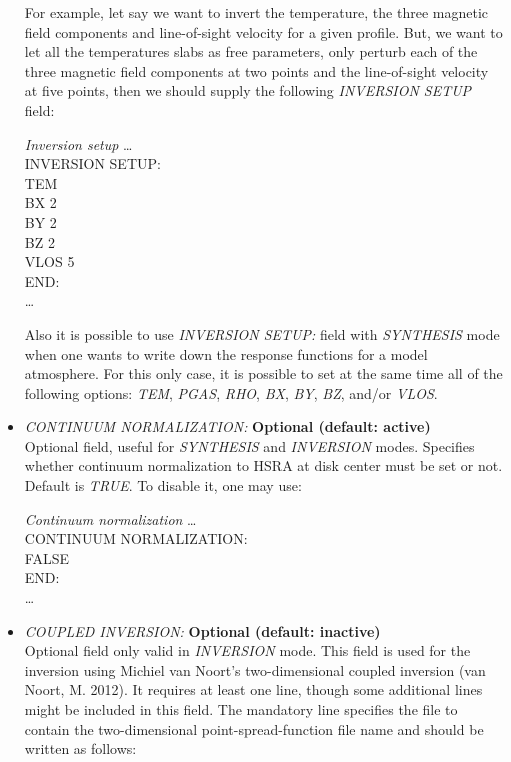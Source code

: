 \begin{itemize}
  For example, let say we want to invert the temperature, the three magnetic field components and line-of-sight velocity for a given profile. But, we want to let all the temperatures slabs as free parameters, only perturb each of the three magnetic field components at two points and the line-of-sight velocity at five points, then we should supply the following {\it INVERSION SETUP} field: \\
\begin{ifbox}[label={tb:inversion_setup}]{{\it Inversion setup}}
  \scriptsize
  \ldots\\
  INVERSION SETUP:\\
  TEM\\
  BX   2\\
  BY   2\\
  BZ   2\\
  VLOS  5\\
  END:\\
  \ldots
  \normalsize
\end{ifbox}
  Also it is possible to use {\it INVERSION SETUP:} field with {\it SYNTHESIS} mode when one wants to write down the response functions for a model atmosphere. For this only case, it is possible to set at the same time all of the following options: {\it TEM}, {\it PGAS}, {\it RHO}, {\it BX}, {\it BY}, {\it BZ}, and/or {\it VLOS}.\\
  \item {\it CONTINUUM NORMALIZATION:} {\bf Optional (default: active)}\\
  Optional field, useful for {\it SYNTHESIS} and {\it INVERSION} modes. Specifies whether continuum normalization to HSRA at disk center must be set or not. Default is {\it TRUE}. To disable it, one may use:\\
\begin{ifbox}[label={tb:continuum_normalization}]{{\it Continuum normalization}}
  \scriptsize
  \ldots\\
  CONTINUUM NORMALIZATION:\\
  FALSE\\
  END:\\
  \ldots
  \normalsize
\end{ifbox}
  \item {\it COUPLED INVERSION:} {\bf Optional (default: inactive)}\\
  Optional field only valid in {\it INVERSION} mode. This field is used for the inversion using Michiel van Noort's two-dimensional coupled inversion (van Noort, M. 2012). It requires at least one line, though some additional lines might be included in this field. The mandatory line specifies the file to contain the two-dimensional point-spread-function file name and should be written as follows:\\

\end{itemize}
